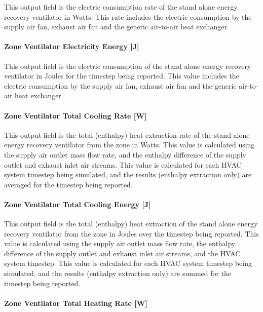 This output field is the electric consumption rate of the stand alone energy recovery ventilator in Watts. This rate includes the electric consumption by the supply air fan, exhaust air fan and the generic air-to-air heat exchanger.

\paragraph{Zone Ventilator Electricity Energy {[}J{]}}\label{zone-ventilator-electric-energy-j}

This output field is the electric consumption of the stand alone energy recovery ventilator in Joules for the timestep being reported. This value includes the electric consumption by the supply air fan, exhaust air fan and the generic air-to-air heat exchanger.

\paragraph{Zone Ventilator Total Cooling Rate {[}W{]}}\label{zone-ventilator-total-cooling-rate-w}

This output field is the total (enthalpy) heat extraction rate of the stand alone energy recovery ventilator from the zone in Watts. This value is calculated using the supply air outlet mass flow rate, and the enthalpy difference of the supply outlet and exhaust inlet air streams. This value is calculated for each HVAC system timestep being simulated, and the results (enthalpy extraction only) are averaged for the timestep being reported.

\paragraph{Zone Ventilator Total Cooling Energy {[}J{]}}\label{zone-ventilator-total-cooling-energy-j}

This output field is the total (enthalpy) heat extraction of the stand alone energy recovery ventilator from the zone in Joules over the timestep being reported. This value is calculated using the supply air outlet mass flow rate, the enthalpy difference of the supply outlet and exhaust inlet air streams, and the HVAC system timestep. This value is calculated for each HVAC system timestep being simulated, and the results (enthalpy extraction only) are summed for the timestep being reported.

\paragraph{Zone Ventilator Total Heating Rate {[}W{]}}\label{zone-ventilator-total-heating-rate-w}

